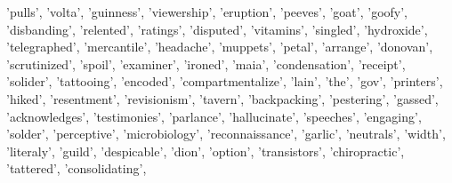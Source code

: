 \documentclass[12pt,]{book}
\newenvironment{Shaded}{\begin{snugshade}}{\end{snugshade}}
\newcommand{\StringTok}[1]{\textcolor[rgb]{0.31,0.60,0.02}{#1}}
\newcommand{\NormalTok}[1]{#1}
\begin{document}
\begin{Shaded}
\begin{Highlighting}[]
                \StringTok{'pulls'}\NormalTok{, }\StringTok{'volta'}\NormalTok{, }\StringTok{'guinness'}\NormalTok{, }\StringTok{'viewership'}\NormalTok{,}
                \StringTok{'eruption'}\NormalTok{, }\StringTok{'peeves'}\NormalTok{, }\StringTok{'goat'}\NormalTok{, }\StringTok{'goofy'}\NormalTok{, }\StringTok{'disbanding'}\NormalTok{, }
                \StringTok{'relented'}\NormalTok{, }\StringTok{'ratings'}\NormalTok{, }\StringTok{'disputed'}\NormalTok{, }\StringTok{'vitamins'}\NormalTok{, }\StringTok{'singled'}\NormalTok{,}
                \StringTok{'hydroxide'}\NormalTok{, }\StringTok{'telegraphed'}\NormalTok{, }\StringTok{'mercantile'}\NormalTok{, }\StringTok{'headache'}\NormalTok{, }
                \StringTok{'muppets'}\NormalTok{, }\StringTok{'petal'}\NormalTok{, }\StringTok{'arrange'}\NormalTok{, }\StringTok{'donovan'}\NormalTok{, }\StringTok{'scrutinized'}\NormalTok{,}
                \StringTok{'spoil'}\NormalTok{, }\StringTok{'examiner'}\NormalTok{, }\StringTok{'ironed'}\NormalTok{, }\StringTok{'maia'}\NormalTok{, }\StringTok{'condensation'}\NormalTok{,}
                \StringTok{'receipt'}\NormalTok{, }\StringTok{'solider'}\NormalTok{, }\StringTok{'tattooing'}\NormalTok{, }\StringTok{'encoded'}\NormalTok{,}
                \StringTok{'compartmentalize'}\NormalTok{, }\StringTok{'lain'}\NormalTok{, }\StringTok{'the'}\NormalTok{, }\StringTok{'gov'}\NormalTok{,}
                \StringTok{'printers'}\NormalTok{, }\StringTok{'hiked'}\NormalTok{, }\StringTok{'resentment'}\NormalTok{, }\StringTok{'revisionism'}\NormalTok{, }\StringTok{'tavern'}\NormalTok{,}
                \StringTok{'backpacking'}\NormalTok{, }\StringTok{'pestering'}\NormalTok{, }\StringTok{'gassed'}\NormalTok{, }\StringTok{'acknowledges'}\NormalTok{,}
                \StringTok{'testimonies'}\NormalTok{, }\StringTok{'parlance'}\NormalTok{, }\StringTok{'hallucinate'}\NormalTok{, }\StringTok{'speeches'}\NormalTok{,}
                \StringTok{'engaging'}\NormalTok{, }\StringTok{'solder'}\NormalTok{, }\StringTok{'perceptive'}\NormalTok{, }\StringTok{'microbiology'}\NormalTok{, }\StringTok{'reconnaissance'}\NormalTok{, }\StringTok{'garlic'}\NormalTok{,}
                \StringTok{'neutrals'}\NormalTok{, }\StringTok{'width'}\NormalTok{, }\StringTok{'literaly'}\NormalTok{, }\StringTok{'guild'}\NormalTok{, }\StringTok{'despicable'}\NormalTok{, }\StringTok{'dion'}\NormalTok{,}
                \StringTok{'option'}\NormalTok{, }\StringTok{'transistors'}\NormalTok{, }\StringTok{'chiropractic'}\NormalTok{, }\StringTok{'tattered'}\NormalTok{, }\StringTok{'consolidating'}\NormalTok{,}

\end{Highlighting}
\end{Shaded}
\end{document}
